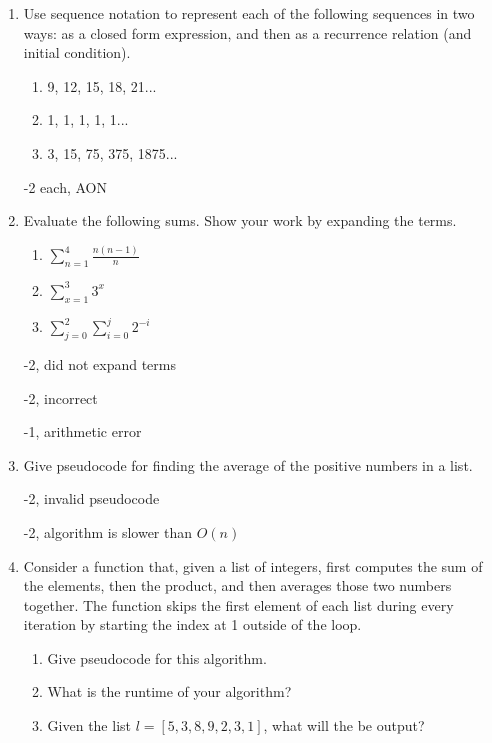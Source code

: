 \begin{enumerate}
\item Use sequence notation to represent each of the following sequences in two ways: as a closed form expression, and then as a recurrence relation (and initial condition). 

\begin{enumerate}
    \item 9, 12, 15, 18, 21...
    \item 1, 1, 1, 1, 1...
    \item 3, 15, 75, 375, 1875...
\end{enumerate}

\begin{rubric}
    -2 each, AON
\end{rubric}

\item Evaluate the following sums. Show your work by expanding the terms. 

\begin{enumerate}
    \item $\sum_{n=1}^{4} \frac{n(n-1)}{n}$
    \item $\sum_{x=1}^{3} 3^x$
    \item $\sum_{j=0}^{2} \sum_{i=0}^{j} 2^{-i}$
\end{enumerate}

\begin{rubric}
    -2, did not expand terms
    
    -2, incorrect
    
    -1, arithmetic error
\end{rubric}

\item Give pseudocode for finding the average of the positive numbers in a list. 

\begin{rubric}
-2, invalid pseudocode

-2, algorithm is slower than $O(n)$
\end{rubric}

\item Consider a function that, given a list of integers, first computes the sum of the elements, then the product, and then averages those two numbers together. The function skips the first element of each list during every iteration by starting the index at 1 outside of the loop. 
\begin{enumerate}
    \item Give pseudocode for this algorithm.
    \item What is the runtime of your algorithm?
    \item Given the list $l = [5,3,8,9,2,3,1]$, what will the be output?
\end{enumerate}


\end{enumerate}
